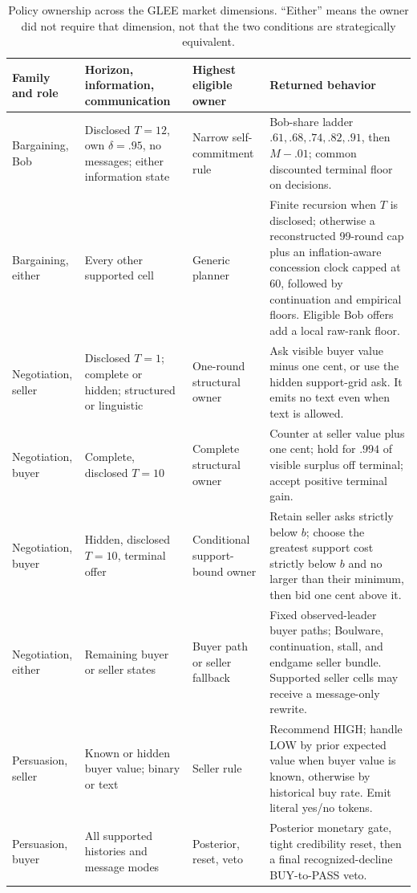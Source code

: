 \begin{table}[h]
\centering
\small
\caption{Policy ownership across the GLEE market dimensions. ``Either'' means
the owner did not require that dimension, not that the two conditions are
strategically equivalent.}
\label{tab:policy_ownership}
\begin{tabularx}{\linewidth}{@{}p{2.1cm}p{3.5cm}p{3.4cm}Y@{}}
\toprule
Family and role & Horizon, information, communication & Highest eligible owner & Returned behavior \\
\midrule
Bargaining, Bob & Disclosed $T=12$, own $\delta=.95$, no messages; either information state & Narrow self-commitment rule & Bob-share ladder $.61,.68,.74,.82,.91$, then $M-.01$; common discounted terminal floor on decisions. \\
Bargaining, either & Every other supported cell & Generic planner & Finite recursion when $T$ is disclosed; otherwise a reconstructed 99-round cap plus an inflation-aware concession clock capped at 60, followed by continuation and empirical floors. Eligible Bob offers add a local raw-rank floor. \\
Negotiation, seller & Disclosed $T=1$; complete or hidden; structured or linguistic & One-round structural owner & Ask visible buyer value minus one cent, or use the hidden support-grid ask. It emits no text even when text is allowed. \\
Negotiation, buyer & Complete, disclosed $T=10$ & Complete structural owner & Counter at seller value plus one cent; hold for $.994$ of visible surplus off terminal; accept positive terminal gain. \\
Negotiation, buyer & Hidden, disclosed $T=10$, terminal offer & Conditional support-bound owner & Retain seller asks strictly below $b$; choose the greatest support cost strictly below $b$ and no larger than their minimum, then bid one cent above it. \\
Negotiation, either & Remaining buyer or seller states & Buyer path or seller fallback & Fixed observed-leader buyer paths; Boulware, continuation, stall, and endgame seller bundle. Supported seller cells may receive a message-only rewrite. \\
Persuasion, seller & Known or hidden buyer value; binary or text & Seller rule & Recommend HIGH; handle LOW by prior expected value when buyer value is known, otherwise by historical buy rate. Emit literal yes/no tokens. \\
Persuasion, buyer & All supported histories and message modes & Posterior, reset, veto & Posterior monetary gate, tight credibility reset, then a final recognized-decline BUY-to-PASS veto. \\
\bottomrule
\end{tabularx}
\end{table}


